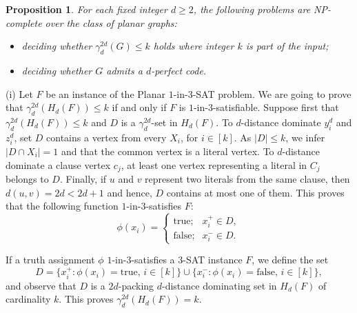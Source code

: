 \documentclass[12pt]{article}
\newtheorem{proposition}[theorem]{Proposition}
\begin{document}
\begin{proposition} \label{prop:NP-perfect-code}
For each fixed integer $d \ge 2$, the following problems are NP-complete over the class of planar graphs:
\begin{itemize}
    \item[$(i)$] deciding whether $\gamma_d^{2d}(G) \leq k$ holds where integer $k$ is part of the input;
    \item[$(ii)$] deciding whether $G$ admits a $d$-perfect code.
\end{itemize} 
\end{proposition}
\proof (i) Let $F$ be an instance of the Planar $1$-in-$3$-SAT problem. We are going to prove that $\gamma_d^{2d}(H_d(F)) \leq k$ if and only if $F$ is $1$-in-$3$-satisfiable. Suppose first that $\gamma_d^{2d}(H_d(F)) \leq k$ and $D$ is a $\gamma_d^{2d}$-set in $H_d(F)$. To $d$-distance dominate $y_i^d$ and $z_i^d$, set $D$ contains a vertex from every $X_i$, for $i \in [k]$. As $|D|\leq k$, we infer $|D\cap X_i|=1$ and that the common vertex is a literal vertex. To $d$-distance dominate a clause vertex $c_j$, at least one vertex representing a literal in $C_j$ belongs to $D$. Finally, if $u$ and $v$ represent two literals from the same clause, then $d(u,v)= 2d <2d+1$ and hence, $D$ contains at most one of them. This proves that the following function $1$-in-$3$-satisfies $F$:  
\begin{equation}  \label{eq:NP-4}
    \phi(x_i)= \left\{ \begin{array}{ll}
		\mbox{true}; & x_i^+ \in D, \\		
		\mbox{false}; & x_i^- \in D.
	\end{array} \right. 
\end{equation}

If a truth assignment $\phi$  $1$-in-$3$-satisfies a $3$-SAT instance $F$, we define the set
\begin{equation}  \label{eq:NP-5}
    D=\{x_i^+: \phi(x_i)=\mbox{true, } i \in [k]\} \cup \{x_i^-: \phi(x_i)=\mbox{false, } i \in [k]\},
\end{equation}
and observe that $D$ is a $2d$-packing $d$-distance dominating set in $H_d(F)$ of cardinality $k$. This proves $\gamma_d^{2d}(H_d(F)) = k$.
\end{document}
